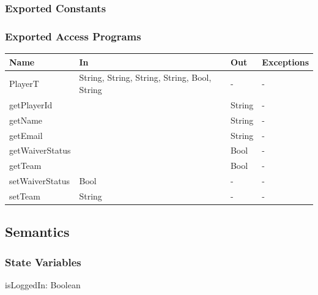 \documentclass[12pt, titlepage]{article}
\begin{document}
\subsubsection{Exported Constants}

\subsubsection{Exported Access Programs}

\begin{center}
  \begin{tabular}{|p{4cm}| p{4cm}| p{4cm} | p{3cm}|}
    \hline
    \textbf{Name}   & \textbf{In}                                  & \textbf{Out} & \textbf{Exceptions} \\
    \hline
    PlayerT         & String, String, String, String, Bool, String & -            & -                   \\
    getPlayerId     &                                              & String       & -                   \\
    getName         &                                              & String       & -                   \\
    getEmail        &                                              & String       & -                   \\
    getWaiverStatus &                                              & Bool         & -                   \\
    getTeam         &                                              & Bool         & -                   \\
    setWaiverStatus & Bool                                         & -            & -                   \\
    setTeam         & String                                       & -            & -                   \\
    \hline
  \end{tabular}
\end{center}

\subsection{Semantics}

\subsubsection{State Variables}
isLoggedIn: Boolean
\end{document}
